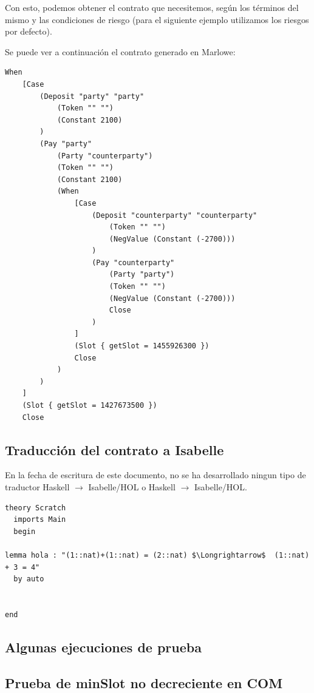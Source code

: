 \documentclass[12pt]{book}
\begin{document}
Con esto, podemos obtener el contrato que necesitemos, según los términos del mismo y las condiciones de riesgo (para el siguiente ejemplo utilizamos los riesgos por defecto).

Se puede ver a continuación el contrato generado en Marlowe:

\begin{lstlisting}[style=Haskell-cardano, language=Marlowe, caption=Contrato COM en Marlowe.]
When
    [Case
        (Deposit "party" "party"
            (Token "" "")
            (Constant 2100)
        )
        (Pay "party"
            (Party "counterparty")
            (Token "" "")
            (Constant 2100)
            (When
                [Case
                    (Deposit "counterparty" "counterparty"
                        (Token "" "")
                        (NegValue (Constant (-2700)))
                    )
                    (Pay "counterparty"
                        (Party "party")
                        (Token "" "")
                        (NegValue (Constant (-2700))) 
                        Close
                    )
                ]
                (Slot { getSlot = 1455926300 })
                Close
            )
        )
    ]
    (Slot { getSlot = 1427673500 })
    Close
\end{lstlisting}



\subsection{Traducción del contrato a Isabelle}

En la fecha de escritura de este documento, no se ha desarrollado ningun tipo de traductor Haskell $\longrightarrow$ Isabelle/HOL o Haskell $\longrightarrow$ Isabelle/HOL.\@

\begin{lstlisting}[style=Isabelle]
theory Scratch
  imports Main
  begin

lemma hola : "(1::nat)+(1::nat) = (2::nat) $\Longrightarrow$  (1::nat) + 3 = 4"
  by auto


end

\end{lstlisting}

\subsection{Algunas ejecuciones de prueba}

\subsection{Prueba de minSlot no decreciente en COM}
\end{document}
